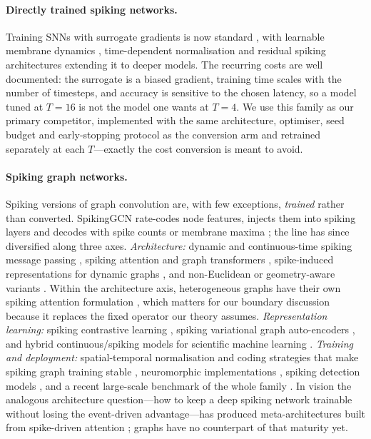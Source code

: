 \paragraph{Directly trained spiking networks.}
Training SNNs with surrogate gradients is now standard \citep{neftci2019surrogate}, with learnable
membrane dynamics \citep{fang2021incorporating}, time-dependent normalisation
\citep{zheng2021going} and residual spiking architectures \citep{fang2021deep} extending it to
deeper models. The recurring costs are well documented: the surrogate is a biased gradient, training
time scales with the number of timesteps, and accuracy is sensitive to the chosen latency, so a model
tuned at $T=16$ is not the model one wants at $T=4$. We use this family as our primary competitor,
implemented with the same architecture, optimiser, seed budget and early-stopping protocol as the
conversion arm and retrained separately at each $T$---exactly the cost conversion is meant to avoid.

\paragraph{Spiking graph networks.}
Spiking versions of graph convolution are, with few exceptions, \emph{trained} rather than
converted. SpikingGCN rate-codes node features, injects them into spiking layers and decodes with
spike counts or membrane maxima \citep{zhu2022spiking}; the line has since diversified along three
axes. \emph{Architecture:} dynamic and continuous-time spiking message passing
\citep{yin2024dgsnn,fan2024continuous}, spiking attention and graph transformers
\citep{sun2024spikegraphormer}, spike-induced representations for dynamic graphs
\citep{chen2024signn,jahin2026chronospike}, and non-Euclidean or geometry-aware variants
\citep{sun2024riemannian,zhang2025geometry}. Within the architecture axis, heterogeneous graphs
have their own spiking attention formulation \citep{cao2025hetgat}, which matters for our boundary
discussion because it replaces the fixed operator our theory assumes. \emph{Representation learning:} spiking contrastive
learning \citep{li2023bit1}, spiking variational graph auto-encoders \citep{yang2022svgae}, and
hybrid continuous/spiking models for scientific machine learning \citep{jain2024hybrid}.
\emph{Training and deployment:} spatial-temporal normalisation and coding strategies that make
spiking graph training stable \citep{xu2024unveiling}, neuromorphic implementations
\citep{snyder2024loihi,yu2025photonic}, spiking detection models \citep{fofanah2026anomaly}, and a
recent large-scale benchmark of the whole family \citep{zhang2025sgnnbench}. In vision the analogous
architecture question---how to keep a deep spiking network trainable without losing the event-driven
advantage---has produced meta-architectures built from spike-driven attention
\citep{yao2023spiking,yao2024spikingv2}; graphs have no counterpart of that maturity yet.

